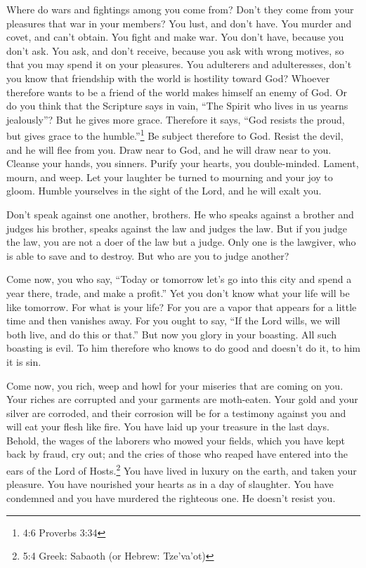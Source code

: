 \mychapter{} \myverse*{}Where do wars and fightings among you come from? Don’t they come
from your pleasures that war in your members?
\myverse{}You lust, and don’t have. You murder and covet, and can’t obtain. You fight
and make war. You don’t have, because you don’t ask.
\myverse{}You ask, and don’t receive, because you ask with wrong motives, so that you
may spend it on your pleasures.
\myverse{}You adulterers and adulteresses, don’t you know that friendship with the world
is hostility toward God? Whoever therefore wants to be a friend of the world makes himself an enemy of
God.
\myverse{}Or do you think that the Scripture says in vain, “The Spirit who lives in us
yearns jealously”?
\myverse{}But he gives more grace. Therefore it says, “God resists the proud, but gives
grace to the humble.”\footnote{4:6 Proverbs 3:34}
\myverse{}Be subject therefore to God. Resist the devil, and he will flee from you.
\myverse{}Draw near to God, and he will draw near to you. Cleanse your hands, you sinners.
Purify your hearts, you double-minded.
\myverse{}Lament, mourn, and weep. Let your laughter be turned to mourning and your joy
to gloom.
\myverse{}Humble yourselves in the sight of the Lord, and he will exalt you.

\myverse{}Don’t speak against one another, brothers. He who speaks against
a brother and judges his brother, speaks against the law and judges the law. But if you judge the law,
you are not a doer of the law but a judge.
\myverse{}Only one is the lawgiver, who is able to save and to destroy. But who are
you to judge another?

\myverse{}Come now, you who say, “Today or tomorrow let’s go into this
city and spend a year there, trade, and make a profit.”
\myverse{}Yet you don’t know what your life will be like tomorrow. For what is your
life? For you are a vapor that appears for a little time and then vanishes away.
\myverse{}For you ought to say, “If the Lord wills, we will both live, and do this or
that.”
\myverse{}But now you glory in your boasting. All such boasting is evil.
\myverse{}To him therefore who knows to do good and doesn’t do it, to him it is sin.


\mychapter{} \myverse*{}Come now, you rich, weep and howl for your miseries that are coming
on you.
\myverse{}Your riches are corrupted and your garments are moth-eaten.
\myverse{}Your gold and your silver are corroded, and their corrosion will be for a testimony
against you and will eat your flesh like fire. You have laid up your treasure in the last days.
\myverse{}Behold, the wages of the laborers who mowed your fields, which you have kept
back by fraud, cry out; and the cries of those who reaped have entered into the ears of the Lord of Hosts.\footnote{5:4 Greek: Sabaoth (or Hebrew: Tze’va’ot)}
\myverse{}You have lived in luxury on the earth, and taken your pleasure. You have nourished
your hearts as in a day of slaughter.
\myverse{}You have condemned and you have murdered the righteous one. He doesn’t resist
you.

